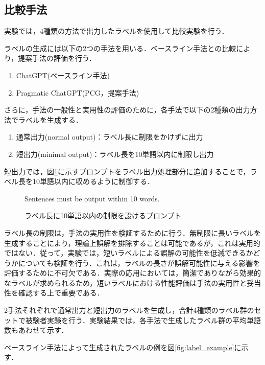 \documentclass[a4paper,11pt]{jreport}
\begin{document}
\subsection{比較手法}

実験では，4種類の方法で出力したラベルを使用して比較実験を行う．

ラベルの生成には以下の2つの手法を用いる．ベースライン手法との比較により，提案手法の評価を行う．
\begin{enumerate}
    \item ChatGPT(ベースライン手法)
    \item Pragmatic ChatGPT(PCG，提案手法)
\end{enumerate}

さらに，手法の一般性と実用性の評価のために，各手法で以下の2種類の出力方法でラベルを生成する．
\begin{enumerate}
  \item 通常出力(normal output)：ラベル長に制限をかけずに出力
  \item 短出力(minimal output)：ラベル長を10単語以内に制限し出力
\end{enumerate}

短出力では，図\ref{fig:limiting_prompt}に示すプロンプトをラベル出力処理部分に追加することで，ラベル長を10単語以内に収めるように制御する．

\begin{figure}[H]
\begin{mdframed}[linewidth=1pt]
Sentences must be output within 10 words.
\end{mdframed}
\caption{ラベル長に10単語以内の制限を設けるプロンプト}
\label{fig:limiting_prompt}
\end{figure}


ラベル長の制限は，手法の実用性を検証するために行う．無制限に長いラベルを生成することにより，理論上誤解を排除することは可能であるが，これは実用的ではない．従って，実験では，短いラベルによる誤解の可能性を低減できるかどうかについても検証を行う．これは，ラベルの長さが誤解可能性に与える影響を評価するために不可欠である．実際の応用においては，簡潔でありながら効果的なラベルが求められるため，短いラベルにおける性能評価は手法の実用性と妥当性を確認する上で重要である．

2手法それぞれで通常出力と短出力のラベルを生成し，合計4種類のラベル群のセットで被験者実験を行う．実験結果では，各手法で生成したラベル群の平均単語数もあわせて示す．

ベースライン手法によって生成されたラベルの例を図\ref{fig:label_example}に示す．
\end{document}
